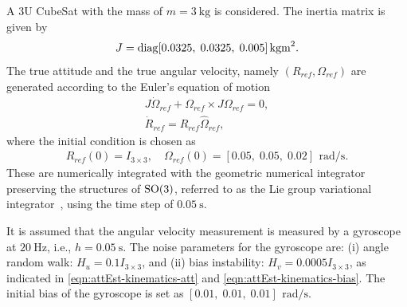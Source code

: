 A 3U CubeSat with the mass of $m=\SI{3}{\kilogram}$ is considered. The inertia matrix is given by
\begin{equation*}
	J=\mathrm{diag}[0.0325,\; 0.0325,\; 0.005]\,\SI{}{\kilogram\meter^2}.
\end{equation*}
The true attitude and the true angular velocity, namely $(R_{ref},\Omega_{ref})$ are generated according to the Euler's equation of motion
\begin{gather*}
	J\dot\Omega_{ref} + \Omega_{ref}\times J\Omega_{ref} =0,\\
	\dot R_{ref} = R_{ref}\hat\Omega_{ref},
\end{gather*}
where the initial condition is chosen as
\begin{gather*}
	R_{ref}(0)=I_{3\times 3},\quad \Omega_{ref}(0)=[0.05,\; 0.05,\; 0.02]\,\SI{}{\radian\per\second}.
\end{gather*}
These are numerically integrated with the geometric numerical integrator preserving the structures of $\mathrm{SO}(3)$, referred to as the Lie group variational integrator~\cite{lee2007lie,lee2007lie-b}, using the time step of $\SI{0.05}{\second}$. 

It is assumed that the angular velocity measurement is measured by a gyroscope at $\SI{20}{\hertz}$, i.e., $h=\SI{0.05}{\second}$.
The noise parameters for the gyroscope are: (i) angle random walk: $H_u=0.1I_{3\times 3}$, and (ii) bias instability: $H_v=0.0005I_{3\times 3}$, as indicated in \eqref{eqn:attEst-kinematics-att} and \eqref{eqn:attEst-kinematics-bias}.
The initial bias of the gyroscope is set as $[0.01,\; 0.01,\; 0.01]\, \SI{}{\radian\per\second}$.

